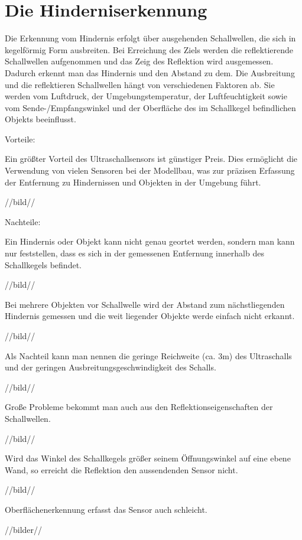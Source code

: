 \renewcommand{\autoren}{Valentyn Chepil}
\newpage
\section{Die Hinderniserkennung}

Die Erkennung vom Hindernis erfolgt über ausgehenden Schallwellen, die sich in kegelförmig Form  ausbreiten. Bei Erreichung des Ziels werden die reflektierende Schallwellen aufgenommen und das Zeig des Reflektion wird ausgemessen. Dadurch erkennt man das Hindernis und den Abstand zu dem. Die Ausbreitung und die reflektieren Schallwellen hängt von verschiedenen Faktoren
ab. Sie werden vom Luftdruck, der Umgebungstemperatur, der Luftfeuchtigkeit sowie
vom Sende-/Empfangswinkel und der Oberfläche des im Schallkegel befindlichen Objekts
beeinflusst.

  Vorteile:


Ein größter Vorteil des Ultraschallsensors ist günstiger Preis. Dies ermöglicht die Verwendung von vielen Sensoren bei der Modellbau, was zur präzisen Erfassung der Entfernung zu Hindernissen und Objekten in der Umgebung führt.

//bild//

  Nachteile:


Ein Hindernis oder Objekt kann nicht genau geortet werden, sondern man kann nur feststellen, dass es sich in der gemessenen Entfernung innerhalb des Schallkegels befindet. 

//bild//

Bei mehrere Objekten vor Schallwelle wird der Abstand zum nächstliegenden Hindernis gemessen und die weit liegender Objekte werde einfach nicht erkannt.

//bild//

Als Nachteil kann man nennen die geringe Reichweite (ca. 3m) des Ultraschalls und  der geringen Ausbreitungsgeschwindigkeit des Schalls.

//bild//

Große Probleme bekommt man auch aus den Reflektionseigenschaften der Schallwellen.


//bild//

Wird das Winkel des Schallkegels größer seinem Öffnungswinkel auf eine ebene Wand, so erreicht die Reflektion den aussendenden Sensor nicht.

//bild//

 Oberflächenerkennung erfasst das Sensor auch schleicht.


//bilder//
